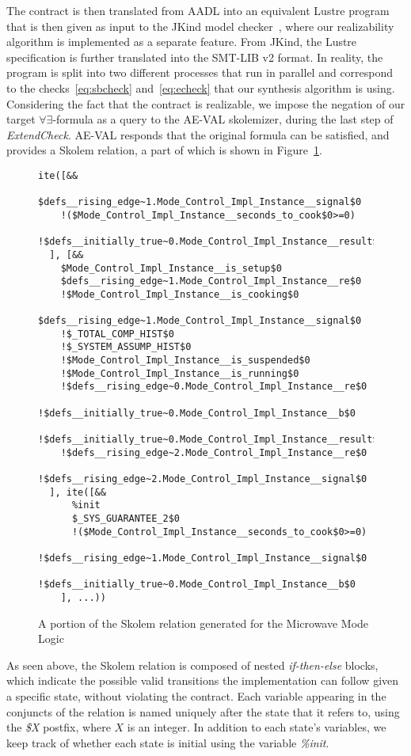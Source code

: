The contract is then translated from AADL into an equivalent Lustre program that
is then given as input to the JKind model checker~\cite{jkind}, where our
realizability algorithm is implemented as a separate feature. From JKind, the
Lustre specification is further translated into the SMT-LIB v2 format. In
reality, the program is split into two different processes that run in parallel and correspond to the
checks~\ref{eq:sbcheck} and~\ref{eq:echeck} that our synthesis algorithm is
using. Considering the fact that the
contract is realizable, we impose the negation of our target
$\forall\exists$-formula as a query to the AE-VAL skolemizer, during the last
step of \textit{ExtendCheck}. AE-VAL responds that the original formula can be
satisfied, and provides a Skolem relation, a part of which is shown in Figure~\ref{fig:skolem-rel}.

\begin{figure}
\label{fig:skolem-rel}
\begin{Verbatim}[obeytabs,fontsize=\tiny]
ite([&&
    $defs__rising_edge~1.Mode_Control_Impl_Instance__signal$0
    !($Mode_Control_Impl_Instance__seconds_to_cook$0>=0)
    !$defs__initially_true~0.Mode_Control_Impl_Instance__result$0
  ], [&&
    $Mode_Control_Impl_Instance__is_setup$0
    $defs__rising_edge~1.Mode_Control_Impl_Instance__re$0
    !$Mode_Control_Impl_Instance__is_cooking$0
    $defs__rising_edge~1.Mode_Control_Impl_Instance__signal$0
    !$_TOTAL_COMP_HIST$0
    !$_SYSTEM_ASSUMP_HIST$0
    !$Mode_Control_Impl_Instance__is_suspended$0
    !$Mode_Control_Impl_Instance__is_running$0
    !$defs__rising_edge~0.Mode_Control_Impl_Instance__re$0
    !$defs__initially_true~0.Mode_Control_Impl_Instance__b$0
    !$defs__initially_true~0.Mode_Control_Impl_Instance__result$0
    !$defs__rising_edge~2.Mode_Control_Impl_Instance__re$0
    !$defs__rising_edge~2.Mode_Control_Impl_Instance__signal$0
  ], ite([&&
      %init
      $_SYS_GUARANTEE_2$0
      !($Mode_Control_Impl_Instance__seconds_to_cook$0>=0)
      !$defs__rising_edge~1.Mode_Control_Impl_Instance__signal$0
      !$defs__initially_true~0.Mode_Control_Impl_Instance__b$0
    ], ...))
\end{Verbatim}
\caption{A portion of the Skolem relation generated for the Microwave Mode Logic}
\end{figure}
As seen above, the Skolem relation is composed of nested
\textit{if-then-else} blocks, which indicate the possible valid transitions the
implementation can follow given a specific state, without
violating the contract. Each variable appearing in the conjuncts of
the relation is named uniquely after the state that it refers to, using the
\textit{\$X} postfix, where $X$ is an integer. In addition to each state's
variables, we keep track of whether each state is initial using the variable
\textit{\%init}.

